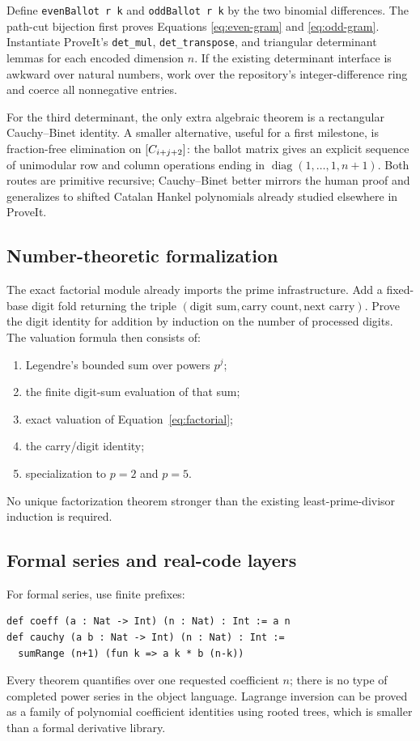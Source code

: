Define \texttt{evenBallot r k} and \texttt{oddBallot r k} by the two binomial
differences.  The path-cut bijection first proves Equations
\eqref{eq:even-gram} and \eqref{eq:odd-gram}.  Instantiate ProveIt's
\texttt{det\_mul}, \texttt{det\_transpose}, and triangular determinant lemmas
for each encoded dimension $n$.  If the existing determinant interface is
awkward over natural numbers, work over the repository's integer-difference
ring and coerce all nonnegative entries.

For the third determinant, the only extra algebraic theorem is a rectangular
Cauchy--Binet identity.  A smaller alternative, useful for a first milestone,
is fraction-free elimination on
$[C_{i+j+2}]$: the ballot matrix gives an explicit sequence of unimodular
row and column operations ending in
$\operatorname{diag}(1,\ldots,1,n+1)$.  Both routes are primitive recursive;
Cauchy--Binet better mirrors the human proof and generalizes to shifted
Catalan Hankel polynomials already studied elsewhere in ProveIt.

\subsection{Number-theoretic formalization}

The exact factorial module already imports the prime infrastructure.  Add a
fixed-base digit fold returning the triple
\((\text{digit sum},\text{carry count},\text{next carry})\).  Prove the digit
identity for addition by induction on the number of processed digits.  The
valuation formula then consists of:
\begin{enumerate}[label=(\arabic*),leftmargin=2em]
\item Legendre's bounded sum over powers $p^j$;
\item the finite digit-sum evaluation of that sum;
\item exact valuation of Equation~\eqref{eq:factorial};
\item the carry/digit identity;
\item specialization to $p=2$ and $p=5$.
\end{enumerate}
No unique factorization theorem stronger than the existing least-prime-divisor
induction is required.

\subsection{Formal series and real-code layers}

For formal series, use finite prefixes:
\begin{lstlisting}[language={}]
def coeff (a : Nat -> Int) (n : Nat) : Int := a n
def cauchy (a b : Nat -> Int) (n : Nat) : Int :=
  sumRange (n+1) (fun k => a k * b (n-k))
\end{lstlisting}
Every theorem quantifies over one requested coefficient $n$; there is no type
of completed power series in the object language.  Lagrange inversion can be
proved as a family of polynomial coefficient identities using rooted trees,
which is smaller than a formal derivative library.

